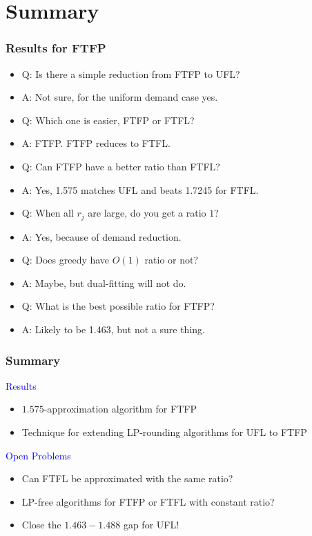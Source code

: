 \documentclass[hyperref,dvipsnames,svgnames,compress]{beamer}
\begin{document}
\section[End]{Summary}
\begin{frame}
  \frametitle{Results for FTFP}
  \begin{itemize}
  \item \color{red}
    Q: Is there a simple reduction from FTFP to UFL?
  \item<2,8> \color{blue}
    A: Not sure, for the uniform demand case yes.
  \item \color{red}
    Q: Which one is easier, FTFP or FTFL?
  \item<3,8> \color{blue}
    A: FTFP. FTFP reduces to FTFL.
  \item \color{red}
    Q: Can FTFP have a better ratio than FTFL?
  \item<4,8> \color{blue}
    A: Yes, 1.575 matches UFL and beats 1.7245 for FTFL.
  \item \color{red}
    Q: When all $r_j$ are large, do you get a ratio $1$?
  \item<5,8> \color{blue}
    A: Yes, because of demand reduction.
  \item \color{red}
    Q: Does greedy have $O(1)$ ratio or not?
  \item<6,8> \color{blue}
    A: Maybe, but dual-fitting will not do.
  \item \color{red}
    Q: What is the best possible ratio for FTFP?
  \item<7,8> \color{blue}
    A: Likely to be 1.463, but not a sure thing.
 \end{itemize}
\end{frame}

\begin{frame}
  \frametitle{Summary}
  
{\large
  {\textcolor{blue}{Results}}

  \begin{itemize}
  	\item $1.575$-approximation algorithm for FTFP
	\item Technique for extending LP-rounding algorithms for UFL to FTFP
  \end{itemize}

\vspace{0.2in}
\pause
  {\textcolor{blue}{Open Problems}}

  \begin{itemize}
  \item Can FTFL be approximated with the same ratio?
  \item LP-free algorithms for FTFP or FTFL with constant ratio?
  \item Close the $1.463-1.488$ gap for UFL!
  \end{itemize}
}

\end{frame}
\end{document}

